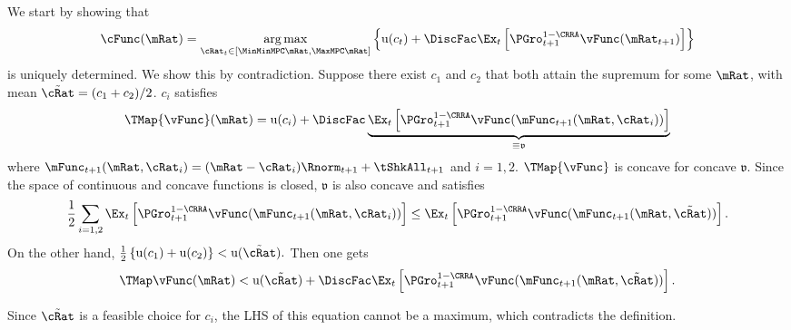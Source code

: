 \documentclass[titlepage]{\econtex}\providecommand{\texname}{BufferStockTheory}%
\begin{document}
We start by showing that
\begin{equation}
\cFunc(\mRat)=\underset{\cRat_{t}\in [\MinMinMPC \mRat,\MaxMPC \mRat]}{\arg \max }\left\{
\util(c_{t})+\DiscFac \Ex_{t}\left[ {\PGro}_{t+1}^{1-\CRRA }\vFunc( {\mRat}_{t+1}) \right] \right\}
\end{equation}
is uniquely determined. We show this by contradiction. Suppose there
exist $c_{1}$ and $c_{2}$ that both attain the supremum for some $\mRat$,
with mean $\tilde{\cRat}=(c_{1}+c_{2})/2$. $c_{i}$ satisfies
\begin{equation}
\TMap{\vFunc}(\mRat)=\util(c_{i})+\DiscFac \underbrace{\Ex_{t}\left[ {\PGro}_{t+1}
^{1-\CRRA }\vFunc(\mFunc_{t+1}( \mRat,\cRat_{i}) )
\right]}_{\equiv \mathfrak{v}}
\end{equation}
where $\mFunc_{t+1}(\mRat,\cRat_{i}) =(\mRat-\cRat_{i})\Rnorm_{t+1}+\tShkAll_{t+1}$ and
$i=1,2$. $\TMap{\vFunc}$ is concave for concave $\mathfrak{v}$. Since the space of
continuous and concave functions is closed, $\mathfrak{v}$ is also
concave and satisfies
\begin{equation}
\frac{1}{2}\sum_{i=1,2}\Ex_{t}\left[ {\PGro}_{t+1}^{1-\CRRA
}\vFunc( \mFunc_{t+1}( \mRat,\cRat_{i}) ) \right] \leq
\Ex_{t}\left[ {\PGro}_{t+1}^{1-\CRRA }\vFunc( \mFunc_{t+1}( \mRat,\tilde{\cRat}) ) \right].
\end{equation}
On the other hand, $\frac{1}{2}\left\{ \util(c_{1})+\util(c_{2})\right\} <\util(
\tilde{\cRat}).$ Then one gets
\begin{equation}
\TMap \vFunc(\mRat)<\util(\tilde{\cRat})+\DiscFac \Ex_{t}\left[ {\PGro}_{t+1}^{1-\CRRA
}\vFunc( \mFunc_{t+1}( \mRat,\tilde{\cRat}) ) \right].
\end{equation}

Since $\tilde{\cRat}$ is a feasible choice for $c_{i}$, the
LHS of this equation cannot be a maximum,  which contradicts the definition.
\end{document}

